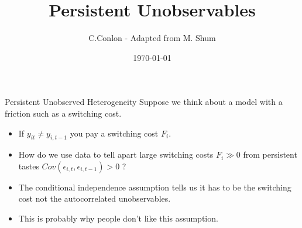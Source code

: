 \documentclass[xcolor=pdftex,dvipsnames,table,mathserif,aspectratio=169]{beamer}
\title [Single-agent dynamic optimization models]{Persistent Unobservables}
\author{C.Conlon - Adapted from M. Shum}
\institute{Grad IO}
\date{\today}
\begin{document}
\begin{frame}
\titlepage
\end{frame}


%
%
%


\begin{frame}{Persistent Unobserved Heterogeneity}
Suppose we think about a model with a friction such as a switching cost.
\begin{itemize}
\item If $y_{it} \neq y_{i,t-1}$ you pay a switching cost $F_i$.
\item How do we use data to tell apart large switching costs $F_i  \gg0$ from persistent tastes $Cov(\epsilon_{i,t},\epsilon_{i,t-1}) > 0$ ?
\item The \alert{conditional independence assumption} tells us it has to be the switching cost not the autocorrelated unobservables.
\item This is probably why people don't like this assumption.
\end{itemize}
\end{frame}
\end{document}
